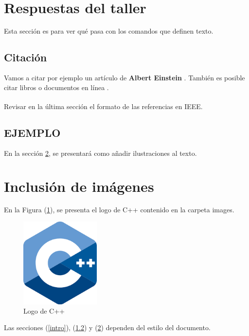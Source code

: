 \documentclass[12pt,letterpaper]{article}
\begin{document}
\section{Respuestas del taller} \label{respuestas}
    Esta sección es para ver qué pasa con los comandos que definen texto.

\subsection{Citación}
    Vamos a citar por ejemplo un artículo de \textbf{Albert Einstein} \cite{einstein}.
    También es posible citar libros \cite{dirac} o documentos en línea \cite{knuthwebsite}.\\\\
    Revisar en la última sección el formato de las referencias en IEEE.

\subsection{EJEMPLO}\label{contenido}


En la sección \ref{imagenes}, se presentará como añadir ilustraciones al texto.

\section{Inclusión de imágenes} \label{imagenes}

En la Figura (\ref{fig:cpplogo}), se presenta el logo de C++ contenido en la carpeta images.

\begin{figure}[H]
\includegraphics[width=4cm]{images/cpplogo.png}
\centering
\caption{Logo de C++}
\label{fig:cpplogo}
\end{figure}


Las secciones (\ref{intro}), (\ref{contenido}) y (\ref{imagenes}) dependen del estilo del documento.



\end{document}
